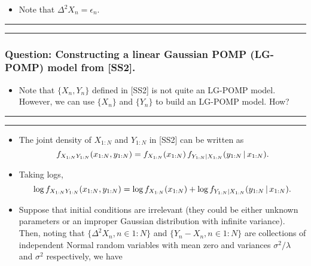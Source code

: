\documentclass[]{article}
\providecommand{\tightlist}{%
  \setlength{\itemsep}{0pt}\setlength{\parskip}{0pt}}
\begin{document}
\begin{itemize}
\tightlist
\item
  Note that \(\Delta^2 X_n = \epsilon_n\).
\end{itemize}

\begin{center}\rule{0.5\linewidth}{\linethickness}\end{center}

\begin{center}\rule{0.5\linewidth}{\linethickness}\end{center}

\subsubsection{Question: Constructing a linear Gaussian POMP (LG-POMP)
model from
{[}SS2{]}.}\label{question-constructing-a-linear-gaussian-pomp-lg-pomp-model-from-ss2.}

\begin{itemize}
\tightlist
\item
  Note that \(\{X_n,Y_n\}\) defined in {[}SS2{]} is not quite an LG-POMP
  model. However, we can use \(\{X_n\}\) and \(\{Y_n\}\) to build an
  LG-POMP model. How?
\end{itemize}

\begin{center}\rule{0.5\linewidth}{\linethickness}\end{center}

\begin{center}\rule{0.5\linewidth}{\linethickness}\end{center}

\begin{itemize}
\item
  The joint density of \(X_{1:N}\) and \(Y_{1:N}\) in {[}SS2{]} can be
  written as
  \[ f_{X_{1:N}Y_{1:N}}(x_{1:N},y_{1:N})= f_{X_{1:N}}(x_{1:N}) \, f_{Y_{1:N}|X_{1:N}}(y_{1:N}{\, | \,} x_{1:N}).\]
\item
  Taking logs,
  \[ \log f_{X_{1:N}Y_{1:N}}(x_{1:N},y_{1:N})= \log f_{X_{1:N}}(x_{1:N}) + \log f_{Y_{1:N}|X_{1:N}}(y_{1:N}{\, | \,} x_{1:N}).\]
\item
  Suppose that initial conditions are irrelevant (they could be either
  unknown parameters or an improper Gaussian distribution with infinite
  variance). Then, noting that \(\{\Delta^2 X_{n}, n\in 1:N\}\) and
  \(\{Y_n-X_n, n\in 1:N\}\) are collections of independent Normal random
  variables with mean zero and variances \(\sigma^2/\lambda\) and
  \(\sigma^2\) respectively, we have
\end{itemize}
\end{document}
